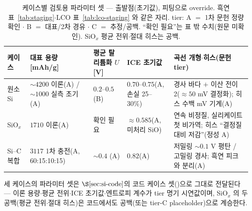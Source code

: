 \begin{table}[h]
\centering\footnotesize
\renewcommand{\arraystretch}{1.3}
\caption{케이스별 검토용 파라미터 셋 --- 출발점(초기값), 피팅으로 override. 흑연 표~\ref{tab:staging}$\cdot$LCO
표~\ref{tab:lco-staging} 와 같은 자리. tier: A $=$ 1차 문헌 정량 확인 $\cdot$ B $=$ 대표/2차 경유 $\cdot$
C $=$ 추정/공백. ``확인 필요''는 표 밖 수치(원문 미확인). SiO$_x$ 평균 전위$\cdot$절대 히스는 공백.}
\label{tab:si-cases}
\begin{tabular}{@{}p{} p{} p{} p{} p{}@{}}
\toprule
케이스 & 대표 용량 [mAh/g] & 평균 탈리튬화 $U$ [V] & ICE 초기값 & 곡선 개형$\cdot$히스(문헌 tier) \\
\midrule
원소 Si   & $\sim4200$ 이론(A) / $\sim1000$ 실측 초기(A) & $0.2$--$0.5$ (B) & $0.70$--$0.75$(A, 손실 25--30\%) & 경사 바다 $+$ 이산 전이 2($\approx50$ mV 결정화); 히스 수백 mV 기계(A) \\
SiO$_x$   & $1710$ 이론(A) & 확인 필요 & $\approx0.585$(A, 미처리 SiO) & 연속 비정질, 실리케이트 첫 비가역; 히스 ``결정질 대비 저감''(정성 A) \\
Si--C 복합 & $3117$ 1차 충전(A, 60:15:10:15) & $\sim0.4$ (A) & $0.82$(A) & 저밀링 $\sim0.1$ V 평탄 / 고밀링 경사; 흑연 피크와 분리(A) \\
\bottomrule
\end{tabular}
\end{table}

세 케이스의 파라미터 셋은 $\S\ref{sec:si-code}$의 코드 케이스 셋()으로 그대로
전달된다 --- 이론 용량$\cdot$평균 전위$\cdot$ICE 초기값$\cdot$엔트로피 계수가 tier 명기 시연값이며,
SiO$_x$ 의 두 공백(평균 전위$\cdot$절대 히스)은 코드에서도 공백(또는 tier-C placeholder)으로 계승한다.

